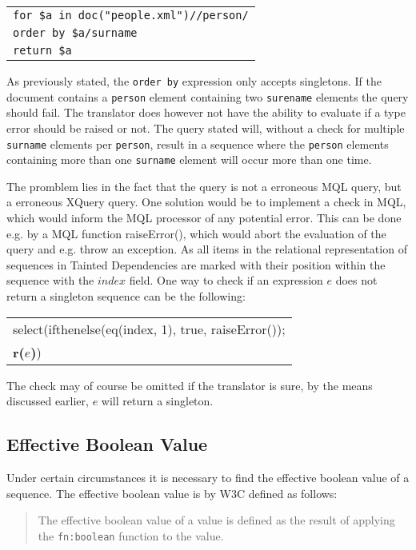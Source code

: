 \begin{center}
\begin{tabular}{l}
\texttt{for \$a in doc("people.xml")//person/} \\
\texttt{order by \$a/surname} \\
\texttt{return \$a}
\end{tabular}
\end{center}

As previously stated, the \texttt{order by} expression only accepts singletons. If the document contains a
\texttt{person} element containing two \texttt{surename} elements the query should fail. The translator does
however not have the ability to evaluate if a type error should be raised or not. The query stated will, without a
check for multiple \texttt{surname} elements per \texttt{person}, result in a sequence where the \texttt{person}
elements containing more than one \texttt{surname} element will occur more than one time. 

The promblem lies in the fact that the query is not a erroneous MQL query, but a erroneous XQuery query. One
solution would be to implement a check in MQL, which would inform the MQL processor of any potential error. This
can be done e.g. by a MQL function \textsf{raiseError()}, which would abort the evaluation of the query and e.g.
throw an exception. As all items in the relational representation of sequences in Tainted Dependencies are marked
with their position within the sequence with the $index$ field. One way to check if an expression $e$ does not
return a singleton sequence can be the following:
\begin{center}
\begin{tabular}{l}
\textsf{select(ifthenelse(eq(index, 1), true, raiseError());} \\ \quad
\textbf{r(}$e$\textbf{)}\textsf{)}
\end{tabular}
\end{center}

The check may of course be omitted if the translator is sure, by the means discussed earlier, $e$ will return a
singleton.

\subsection{Effective Boolean Value}
\label{sect:disc:effBool}
Under certain circumstances it is necessary to find the effective boolean value of a sequence. The effective
boolean value is by W3C defined as follows\cite{w3c00}: 
\begin{quote}
The effective boolean value of a value is defined as the result of applying the \texttt{fn:boolean} function to
the value.
\end{quote}

